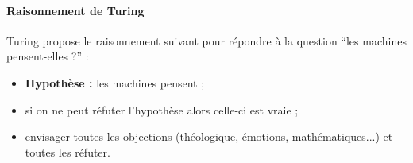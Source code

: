 \paragraph{Raisonnement de Turing}
Turing propose le raisonnement suivant pour répondre à la question ``les machines pensent-elles ?'' :
\begin{itemize}
	\item \textbf{Hypothèse :} les machines pensent ;
	\item si on ne peut réfuter l'hypothèse alors celle-ci est vraie ;
	\item envisager toutes les objections (théologique, émotions, mathématiques...) et toutes les réfuter.
\end{itemize}
